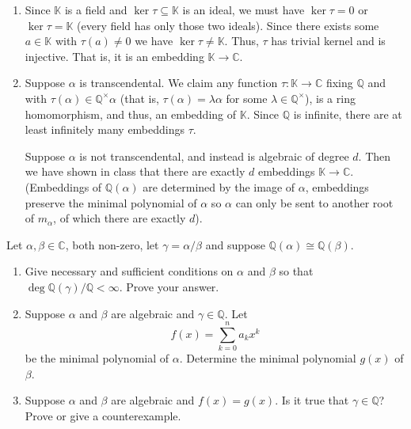 \documentclass[12 pt, letterpaper]{hmcpset}
\begin{document}
\begin{solution}
	\begin{enumerate}
		\item Since $\mathbb{K}$ is a field and  $\ker \tau \subseteq \mathbb{K}$ is an ideal, we must have $\ker \tau = 0$ or $\ker \tau = \mathbb{K}$ (every field has only those two ideals). Since there exists some $a \in \mathbb{K}$ with $\tau(a) \neq 0$ we have $\ker \tau \neq \mathbb{K}$. Thus, $\tau$ has trivial kernel and is injective. That is, it is an embedding $\mathbb{K} \to \mathbb{C}$.

		\item Suppose $\alpha$ is transcendental. We claim any function $\tau : \mathbb{K} \to \mathbb{C}$ fixing $\mathbb{Q}$ and with $\tau(\alpha) \in \mathbb{Q}^{\times} \alpha$ (that is, $\tau(\alpha) = \lambda \alpha$ for some $\lambda \in \mathbb{Q}^\times$), is a ring homomorphism, and thus, an embedding of $\mathbb{K}$. Since $\mathbb{Q}$ is infinite, there are at least infinitely many embeddings $\tau$.

			Suppose $\alpha$ is not transcendental, and instead is algebraic of degree $d$. Then we have shown in class that there are exactly $d$ embeddings $\mathbb{K} \to \mathbb{C}$. (Embeddings of $\mathbb{Q}(\alpha)$ are determined by the image of $\alpha$, embeddings preserve the minimal polynomial of $\alpha$ so $\alpha$ can only be sent to another root of $m_{\alpha}$, of which there are exactly $d$).
	\end{enumerate}
\end{solution}

\pagebreak

\begin{problem}[Problem 6.]
	Let $\alpha, \beta \in \mathbb{C}$, both non-zero, let $\gamma = \alpha / \beta$ and suppose $\mathbb{Q}(\alpha) \cong \mathbb{Q}(\beta)$.
	\begin{enumerate}
		\item Give necessary and sufficient conditions on $\alpha$ and $\beta$ so that $\deg \mathbb{Q}(\gamma) / \mathbb{Q} < \infty$. Prove your answer.

		\item Suppose $\alpha$ and $\beta$ are algebraic and $\gamma \in \mathbb{Q}$. Let
			\[
				f(x) = \sum_{k = 0}^{n} a_{k} x^{k}
			\]
			be the minimal polynomial of $\alpha$. Determine the minimal polynomial $g(x)$ of $\beta$.

		\item Suppose $\alpha$ and $\beta$ are algebraic and $f(x) = g(x)$. Is it true that $\gamma \in \mathbb{Q}$? Prove or give a counterexample.
	\end{enumerate}
\end{problem}
\end{document}
